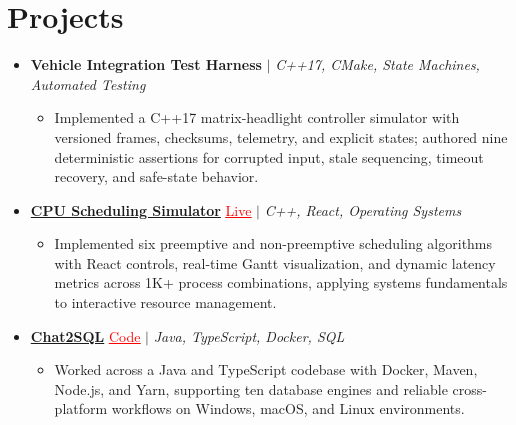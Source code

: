 \documentclass[letterpaper,10pt]{article}
\newcommand{\itemTail}{\vspace{-4pt}}
\newcommand{\projGap}{\vspace{3pt}}
\newcommand{\resumeItem}[1]{\item\small{{#1 \itemTail}}}
\newcommand{\resumeProjectHeading}[1]{\item \small #1 \vspace{-2pt}}
\newcommand{\resumeProjectLink}[2]{\href{#1}{\textcolor{red}{\underline{#2}}}}
\newcommand{\resumeSubHeadingListStart}{\begin{itemize}[leftmargin=0.0in, label={}]}
\newcommand{\resumeSubHeadingListEnd}{\end{itemize}}
\newcommand{\resumeProjItemListStart}{\begin{itemize}[leftmargin=0.15in,label=\textbullet,itemsep=3pt,topsep=0pt,parsep=0pt,partopsep=0pt]}
\newcommand{\resumeProjItemListEnd}{\end{itemize}\vspace{-4pt}}
\begin{document}
\section{Projects}
\resumeSubHeadingListStart
\vspace{-2pt}
\resumeProjectHeading{\textbf{Vehicle Integration Test Harness} $|$ \emph{C++17, CMake, State Machines, Automated Testing}}
\resumeProjItemListStart
\resumeItem{Implemented a C++17 matrix-headlight controller simulator with versioned frames, checksums, telemetry, and explicit states; authored nine deterministic assertions for corrupted input, stale sequencing, timeout recovery, and safe-state behavior.}
\resumeProjItemListEnd
\projGap
\resumeProjectHeading{\href{https://cpu-scheduler-amber.vercel.app/}{\textbf{CPU Scheduling Simulator}} \resumeProjectLink{https://cpu-scheduler-amber.vercel.app/}{Live} $|$ \emph{C++, React, Operating Systems}}
\resumeProjItemListStart
\resumeItem{Implemented six preemptive and non-preemptive scheduling algorithms with React controls, real-time Gantt visualization, and dynamic latency metrics across 1K+ process combinations, applying systems fundamentals to interactive resource management.}
\resumeProjItemListEnd
\projGap
\resumeProjectHeading{\href{https://github.com/SAHAJ-BHADJA/Chat2SQL}{\textbf{Chat2SQL}} \resumeProjectLink{https://github.com/SAHAJ-BHADJA/Chat2SQL}{Code} $|$ \emph{Java, TypeScript, Docker, SQL}}
\resumeProjItemListStart
\resumeItem{Worked across a Java and TypeScript codebase with Docker, Maven, Node.js, and Yarn, supporting ten database engines and reliable cross-platform workflows on Windows, macOS, and Linux environments.}
\resumeProjItemListEnd
\resumeSubHeadingListEnd
\end{document}
